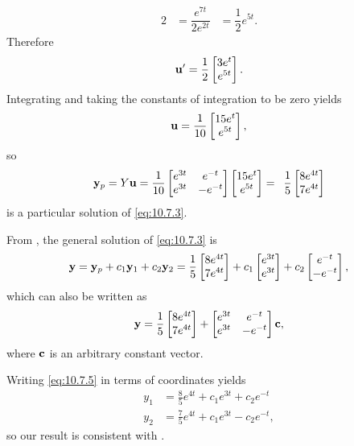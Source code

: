 \begin{alistSolution}
\begin{alignat*}{2}
&=\dfrac{e^{7t}}{2e^{2t}}
&=\dfrac{1}{2}e^{5t}.
\end{alignat*}
 Therefore
\[
\mathbf{u}'=\frac{1}{2}\begin{bmatrix}3e^t\\e^{5t}\end{bmatrix}.
\]
Integrating and taking the constants of integration to be zero yields
\[
\mathbf{u}=\frac{1}{10}\begin{bmatrix}15e^t\\e^{5t}\end{bmatrix},
\]
so
\[
\mathbf{y}_p=Y\mathbf{u}=
\dfrac{1}{10}\begin{bmatrix}e^{3t}&e^{-t}\\e^{3t}&-e^{-t}\end{bmatrix}
\begin{bmatrix}15e^t\\e^{5t}\end{bmatrix}
=\phantom{0}
\dfrac{1}{5}\begin{bmatrix}8e^{4t}\\7e^{4t}\end{bmatrix}
\]
is a particular solution of  \eqref{eq:10.7.3}.

\item From , the general solution of
\eqref{eq:10.7.3} is
\begin{equation} \label{eq:10.7.5}
\mathbf{y}=\mathbf{y}_p+c_1\mathbf{y}_1+c_2\mathbf{y}_2=
\frac{1}{5}\begin{bmatrix}8e^{4t}\\7e^{4t}\end{bmatrix}
+c_1\begin{bmatrix}e^{3t}\\e^{3t}\end{bmatrix}
+c_2\begin{bmatrix}e^{-t}\\-e^{-t}\end{bmatrix},
\end{equation}
which can also be written as
\[
\mathbf{y}=
\frac{1}{5}\begin{bmatrix}8e^{4t}\\7e^{4t}\end{bmatrix}
+\begin{bmatrix}e^{3t}&e^{-t}\\e^{3t}&-e^{-t}\end{bmatrix}
\mathbf{c},
\]
where $\mathbf{c}$ is an arbitrary constant vector.

Writing \eqref{eq:10.7.5} in terms of
coordinates yields
\begin{align*}
y_1&=\frac{8}{5}e^{4t}+c_1e^{3t}+c_2e^{-t}\\
y_2&=\frac{7}{5}e^{4t}+c_1e^{3t}-c_2e^{-t},
\end{align*}
so our result is consistent with .
\end{alistSolution}

